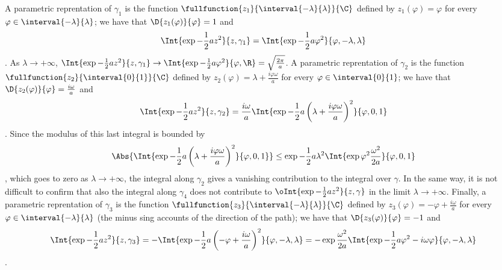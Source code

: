 %
A parametric reprentation of $\gamma_{1}$ is the function
$\fullfunction{z_{1}}{\interval{-\lambda}{\lambda}}{\C}$ defined by
$z_{1}(\varphi) = \varphi$ for every
$\varphi\in\interval{-\lambda}{\lambda}$; we have that $\D{z_{1}(\varphi)}{\varphi} =
1$ and
\begin{dmath*}[compact]%
   \Int{\exp{-\frac{1}{2}az^{2}}}{z, \gamma_{1}} =
   \Int{\exp{-\frac{1}{2}a\varphi^{2}}}{\varphi, -\lambda, \lambda}
\end{dmath*}.
As $\lambda\rightarrow+\infty$, $\Int{\exp{-\frac{1}{2}a z^{2}}}{z, \gamma_{1}}
\rightarrow \Int{\exp{-\frac{1}{2} a\varphi^{2}}}{\varphi, \R} =
\sqrt{\frac{2\pi}{a}}$.
%
A parametric reprentation of $\gamma_{2}$ is the function
$\fullfunction{z_{2}}{\interval{0}
   {1}}{\C}$ defined by
$z_{2}(\varphi) = \lambda + \frac{i\varphi\omega}{a} $ for every
$\varphi\in\interval{0}{1}$; we have that $\D{z_{2}(\varphi)}{\varphi} =
\frac{i\omega}{a}$ and
\begin{dmath*}[compact]%
   \Int{\exp{-\frac{1}{2}az^{2}}}{z, \gamma_{2}} =
\frac{i\omega}{a} \Int{\exp{-\frac{1}{2}a\left( \lambda  + \frac{i\varphi \omega}{a}
	 \right)^{2}}}{\varphi ,0,1}
\end{dmath*}.
Since the modulus of this last integral is bounded by 
\begin{dmath*}[compact]
   \Abs{ 
\Int{\exp{-\frac{1}{2}a\left( \lambda  + \frac{i\varphi \omega}{a}
	 \right)^{2}}}{\varphi ,0,1}
} \leq   \exp{-\frac{1}{2} a \lambda^{2}} \Int{ \exp{ \varphi^{2}
      \frac{\omega^{2} }{2a}}}{\varphi, 0, 1}
\end{dmath*},
which goes to zero 
as $\lambda\rightarrow+\infty$, the integral along
$\gamma_{2}$ gives a vanishing contribution to the integral over $\gamma$.
In the same way, it is not difficult to confirm that also the integral along
$\gamma_{4}$ does not contribute to $\oInt{\exp{-\frac{1}{2}az^2}}{z,\gamma}$ in the limit $\lambda\rightarrow+\infty$.
%
Finally, a parametric reprentation of $\gamma_{3}$ is the function
$\fullfunction{z_{3}}{\interval{-\lambda}
   {\lambda}}{\C}$ defined by
$z_{3}(\varphi) = -\varphi + \frac{i\omega}{a}$ for every
$\varphi\in\interval{-\lambda}{\lambda}$ (the minus sing accounts of the
direction of the path); we have that $\D{z_{3}(\varphi)}{\varphi} =-1
$ and
\begin{dmath*}[compact]%
   \Int{\exp{-\frac{1}{2}az^{2}}}{z, \gamma_{3}} =
   -\Int{\exp{-\frac{1}{2}a\left( -\varphi+ \frac{i\omega}{a}
	 \right)^{2}}}{\varphi, -\lambda, \lambda}=
   -\exp{\frac{\omega^{2}}{2a}}
   \Int{\exp{-\frac{1}{2}a\varphi^{2} - i\omega \varphi }
	 }{\varphi, -\lambda, \lambda} 
\end{dmath*}.
